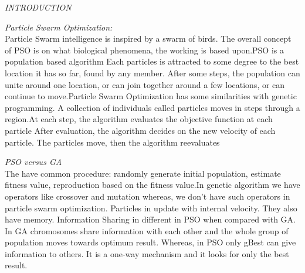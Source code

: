 \documentclass{article}
\begin{document}
\renewcommand\thepage{} %
\newpage
\begin{center}

\begin{center}
\emph{\LARGE INTRODUCTION}\\[1cm]
    
\end{center}
\begin{center}
\begin{minipage}{33em}
\noindent
\emph{\LARGE Particle Swarm Optimization: }\\[0.5cm]

Particle Swarm intelligence is inspired by a swarm of birds.
The overall concept of PSO is on what biological phenomena, 
the working is based upon.PSO is a population based algorithm
Each particles is attracted to some degree to the best 
location it has so far, found by any member. After some steps, 
the population can unite around one location, or can 
join together around a few locations, or can continue 
to move.Particle Swarm Optimization has some similarities 
with genetic programming. A collection of individuals 
called particles moves in steps through a region.At each step, 
the algorithm evaluates the objective function at each particle 
After evaluation, the algorithm decides on the new velocity of each particle. 
The particles move, then the algorithm reevaluates

\vspace{0.25in}
\noindent
\emph{\LARGE PSO versus GA }\\[0.5cm]
The have common procedure: randomly generate initial population, estimate fitness value, reproduction based on the fitness value.In genetic algorithm we have operators like crossover and mutation whereas, we don’t have such operators in particle swarm optimization. Particles in update with internal velocity. They also have memory.
Information Sharing in different in PSO when compared with GA. In GA chromosomes share information with each other and the whole group of population moves towards optimum result. 
Whereas, in PSO only gBest can give information to others. It is a one-way mechanism and it looks for only the best result. 





\end{minipage}
\end{center}
\newpage

\begin{center}


\end{center}
\end{center}
\end{document}
